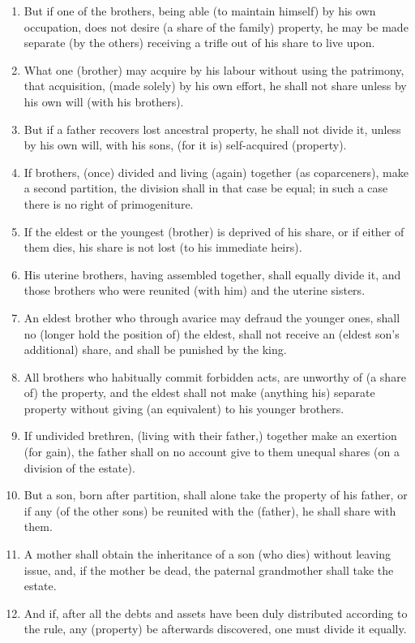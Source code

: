 \begin{enumerate}
\item But if one of the brothers, being able (to maintain himself) by his own occupation, does not desire (a share of the family) property, he may be made separate (by the others) receiving a trifle out of his share to live upon.
\item What one (brother) may acquire by his labour without using the patrimony, that acquisition, (made solely) by his own effort, he shall not share unless by his own will (with his brothers).
\item But if a father recovers lost ancestral property, he shall not divide it, unless by his own will, with his sons, (for it is) self-acquired (property).
\item If brothers, (once) divided and living (again) together (as coparceners), make a second partition, the division shall in that case be equal; in such a case there is no right of primogeniture.
\item If the eldest or the youngest (brother) is deprived of his share, or if either of them dies, his share is not lost (to his immediate heirs).
\item His uterine brothers, having assembled together, shall equally divide it, and those brothers who were reunited (with him) and the uterine sisters.
\item An eldest brother who through avarice may defraud the younger ones, shall no (longer hold the position of) the eldest, shall not receive an (eldest son's additional) share, and shall be punished by the king.
\item All brothers who habitually commit forbidden acts, are unworthy of (a share of) the property, and the eldest shall not make (anything his) separate property without giving (an equivalent) to his younger brothers.
\item If undivided brethren, (living with their father,) together make an exertion (for gain), the father shall on no account give to them unequal shares (on a division of the estate).
\item But a son, born after partition, shall alone take the property of his father, or if any (of the other sons) be reunited with the (father), he shall share with them.
\item A mother shall obtain the inheritance of a son (who dies) without leaving issue, and, if the mother be dead, the paternal grandmother shall take the estate.
\item And if, after all the debts and assets have been duly distributed according to the rule, any (property) be afterwards discovered, one must divide it equally.

\end{enumerate}
